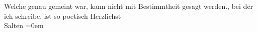 \begin{ledgroupsized}[t]{13cm}
{{{                  Welche genau gemeint war, kann nicht mit Bestimmtheit gesagt werden.}}}\label{K_L03327-4h}, bei
               der ich schreibe, ist so poetisch\pend
           \pstart
           Herzlichst {\\[\baselineskip]}\spacefill\mbox{Salten}\pend
           \leftskip=0em{}
         
         \endnumbering{}\end{ledgroupsized}  \newcommand{\dateiname}{L03327}\newcommand{\titel}{Felix Salten an Arthur Schnitzler, [24. 3. 1902]}\newcommand{\editorInnen}{Martin Anton Müller und Laura Untner}
      